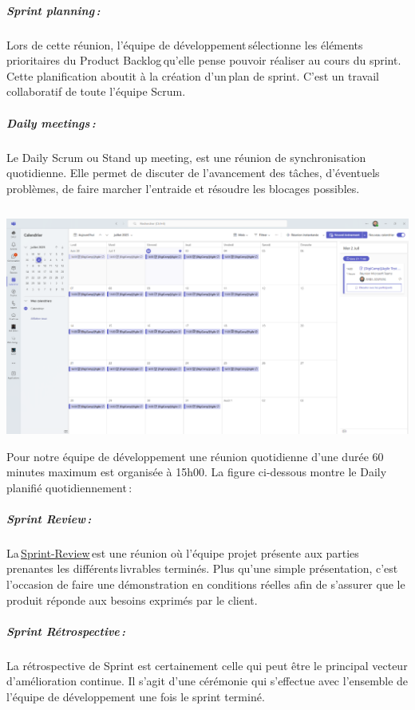 \documentclass[12pt,a4paper,twoside]{report}
\begin{document}
\hypertarget{sprint-planning}{%
\subparagraph{Sprint planning\,:}\label{sprint-planning}}

Lors de cette réunion, l'équipe de développement\,sélectionne les
éléments prioritaires du Product Backlog\,qu'elle pense pouvoir réaliser
au cours du sprint. Cette planification aboutit à la création d'un\,plan
de sprint. C'est un travail collaboratif de toute l'équipe Scrum.~~

\hypertarget{daily-meetings}{%
\subparagraph{Daily meetings\,:}\label{daily-meetings}}

Le Daily Scrum ou Stand up meeting, est une réunion de synchronisation
quotidienne. Elle permet de discuter de l'avancement des tâches,
d'éventuels problèmes, de faire marcher l'entraide et résoudre les
blocages possibles.\,~

\includegraphics[width=5.78194in,height=3.10069in]{latex_media/media/image9.png}Pour
notre équipe de développement une réunion quotidienne d'une durée 60
minutes maximum est organisée à 15h00. La figure ci-dessous montre le
Daily planifié quotidiennement\,:~

\hypertarget{sprint-review}{%
\subparagraph{Sprint Review\,:}\label{sprint-review}}

La\,\href{https://www.appvizer.fr/magazine/operations/gestion-de-projet/sprint-review}{Sprint-Review}\,est
une réunion où l'équipe projet présente aux parties prenantes les
différents\,livrables terminés. Plus qu'une simple présentation, c'est
l'occasion de faire une démonstration en conditions réelles afin de
s'assurer que le produit réponde aux besoins exprimés par le client.~

\hypertarget{sprint-ruxe9trospective}{%
\subparagraph{Sprint Rétrospective\,:~}\label{sprint-ruxe9trospective}}

La rétrospective de Sprint est certainement celle qui peut être le
principal vecteur d'amélioration continue. Il s'agit d'une cérémonie qui
s'effectue avec l'ensemble de l'équipe de développement une fois le
sprint terminé.\,
\end{document}
